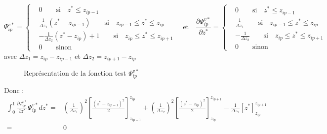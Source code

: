 $$
\Psi_{ip}^{v*} =
\left\{ \begin{aligned}
&0 \qquad \text{si} \quad z^* \leqslant z_{ip-1} \\
&\frac{1}{\Delta z_1}(z^* - z_{ip-1})\qquad \text{si} \quad z_{ip-1} \leqslant z^* \leqslant z_{ip}\\
&-\frac{1}{\Delta z_2}(z^* - z_{ip}) +1 \qquad \text{si} \quad z_{ip} \leqslant z^* \leqslant z_{ip+1}\\
&0 \qquad \text{sinon}
\end{aligned} \right. 
\quad \text{et} \quad
\frac{\partial \Psi_{ip}^{v*}}{\partial z^* } =
\left\{ \begin{aligned}
&0 \qquad \text{si} \quad z^* \leqslant z_{ip-1} \\
&\frac{1}{\Delta z_1} \qquad \text{si} \quad z_{ip-1} \leqslant z^* \leqslant z_{ip}\\
&-\frac{1}{\Delta z_2} \qquad \text{si} \quad z_{ip} \leqslant z^* \leqslant z_{ip+1}\\
&0 \qquad \text{sinon}
\end{aligned} \right. 
$$
avec ${\Delta z_1} = z_{ip}-z_{ip-1}$ et ${\Delta z_2} = z_{ip+1}-z_{ip}$\\

\begin{figure}[H]
   
   \caption{Représentation de la fonction test $\Psi_{ip}^{v*}$}
\end{figure}


Donc :
\begin{align*}
\int_0^1 \frac{\partial \Psi_{ip}^{v*}}{\partial z^* } \Psi_{ip}^{v*} d z^* =& \left( \frac{1}{\Delta z_1}\right)^2 \left[\frac{(z^* - z_{ip-1})^2}{2} \right] _{z_{ip-1}}^{ z_{ip}}+\left( \frac{1}{\Delta z_2}\right)^2 \left[\frac{(z^* - z_{ip})^2}{2} \right] _{z_{ip}}^{ z_{ip+1}} - \frac{1}{\Delta z_2}\left[z^* \right]_{z_{ip}}^{ z_{ip+1}}\\
=&0
\end{align*}